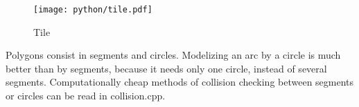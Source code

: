 \documentclass{extarticle}
\begin{document}
\begin{figure}[H]
\hspace*{-1.5cm}
    \texttt{[image: python/tile.pdf]}
	\caption{Tile}
\end{figure}

Polygons consist in segments and circles. Modelizing an arc by a circle is much better than by segments, because it needs only one circle, instead of several segments. Computationally cheap methods of collision checking between segments or circles can be read in collision.cpp.


{}
\end{document}
